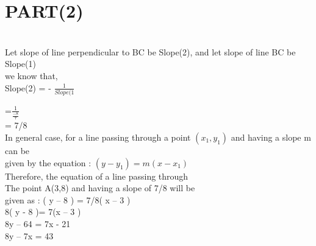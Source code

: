 \documentclass[ twocoloumns, 20pts]{IEEEtran}
\begin{document}
\section*{\large{PART(2)}}\\
{
Let slope of line perpendicular to BC be Slope(2), and
let slope of line BC be Slope(1)\\
we know that,\\
Slope(2) = - $\frac{1}{Slope(1}$\\
}

\hspace{1.3cm}=$\frac{1}{\frac{-8}{7}}$\\

\hspace{1.3cm}= 7/8\\

In general case, for a line passing through a point
$(x_1,y_1)$ and having a slope m can be\\ 
given by the equation :   $( y - y_1) = m ( x - x_1)$\\

Therefore, the equation of a line passing through\\
The point A(3,8) and having a slope of  7/8 will be\\
given as :  ( y – 8 ) = 7/8( x – 3 )\\

\hspace{1.5cm}8( y - 8 )= 7(x – 3 )\\

\hspace{1.5cm}8y – 64 = 7x - 21\\

\hspace{1.5cm}8y – 7x = 43\\


\end{document}
